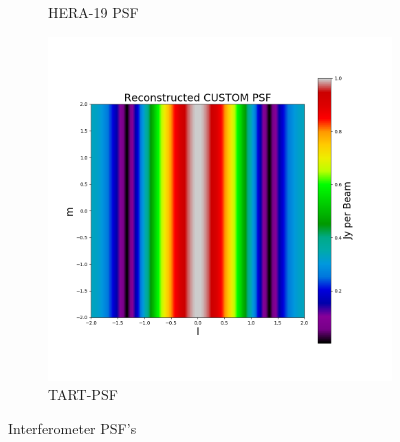 \begin{figure}[H]
\begin{subfigure}[b]{0.3\textwidth}
    \caption{HERA-19 PSF}
    \label{fig:2}
  \end{subfigure}
  \begin{subfigure}[b]{0.3\textwidth}
    \includegraphics[width=\textwidth]{images/TART_PSF.png}
    \caption{TART-PSF}
    \label{fig:2}
  \end{subfigure}
  \caption{Interferometer PSF's}
\end{figure}
